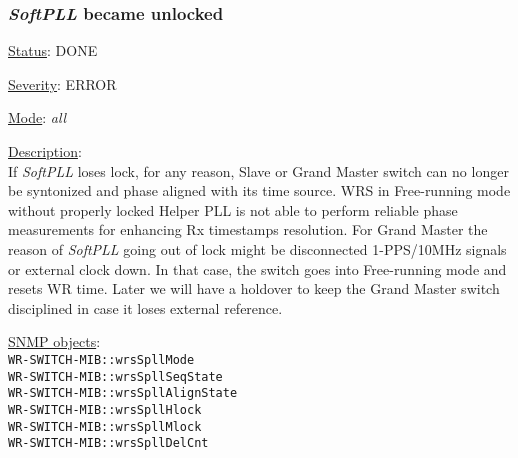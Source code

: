 \subsubsection{\bf \emph{SoftPLL} became unlocked}
		\label{fail:timing:spll_unlock}
		\begin{packed_enum}
			\item [] \underline{Status}: DONE
			\item [] \underline{Severity}: ERROR
			\item [] \underline{Mode}: \emph{all}
			\item [] \underline{Description}:\\
				If \emph{SoftPLL} loses lock, for any reason, Slave or Grand Master
				switch can no longer be syntonized and phase aligned with its time
				source. WRS in Free-running mode without properly locked Helper PLL is
				not able to perform reliable phase measurements for enhancing Rx
				timestamps resolution. For Grand Master the reason of \emph{SoftPLL}
				going out of lock might be disconnected 1-PPS/10MHz signals or external
				clock down. In that case, the switch goes into Free-running mode and
				resets WR time. Later we will have a holdover to keep the Grand Master
				switch disciplined in case it loses external reference.
			\item [] \underline{SNMP objects}:\\
				\texttt{WR-SWITCH-MIB::wrsSpllMode}\\
				\texttt{WR-SWITCH-MIB::wrsSpllSeqState}\\
				\texttt{WR-SWITCH-MIB::wrsSpllAlignState}\\
				\texttt{WR-SWITCH-MIB::wrsSpllHlock}\\
				\texttt{WR-SWITCH-MIB::wrsSpllMlock}\\
				\texttt{WR-SWITCH-MIB::wrsSpllDelCnt}
		\end{packed_enum}

